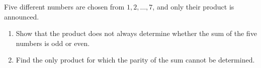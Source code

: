 Five different numbers are chosen from $1,2,\dots,7$, and only their product is announced.
\begin{enumerate}
\item[(a)] Show that the product does not always determine whether the sum of the five numbers is odd or even.
\item[(b)] Find the only product for which the parity of the sum cannot be determined.
\end{enumerate}
